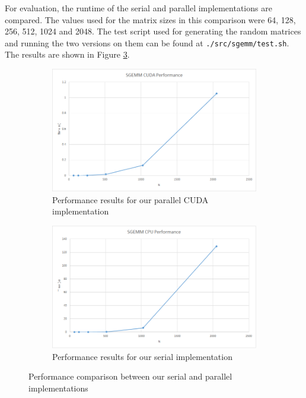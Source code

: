 \documentclass[11pt,a4paper]{article}
\begin{document}
	For evaluation, the runtime of the serial and parallel implementations are compared. The values used for the matrix sizes in this comparison were 64, 128, 256, 512, 1024 and 2048. The test script used for generating the random matrices and running the two versions on them can be found at \texttt{./src/sgemm/test.sh}. The results are shown in Figure \ref{perf}.
	\begin{figure}
		\centering
		\begin{subfigure}[b]{0.45\textwidth}
			\includegraphics[width=\textwidth]{sgemm_cuda.png}
			\caption{Performance results for our parallel CUDA implementation}
			\label{nbody_cuda}
		\end{subfigure}
		\begin{subfigure}[b]{0.45\textwidth}
			\includegraphics[width=\textwidth]{sgemm_cpu.png}
			\caption{Performance results for our serial implementation}
			\label{nbody_cpu}
		\end{subfigure}
		\caption{Performance comparison between our serial and parallel implementations}
		\label{perf}
	\end{figure}
	\pagebreak
	
\end{document}
